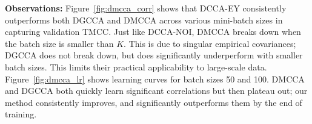 
\textbf{Observations:}
Figure~\ref{fig:dmcca_corr} shows that DCCA-EY consistently outperforms both DGCCA and DMCCA across various mini-batch sizes in capturing validation TMCC.
Just like DCCA-NOI, DMCCA breaks down when the batch size is smaller than $K$. This is due to singular empirical covariances; DGCCA does not break down, but does significantly underperform with smaller batch sizes.
This limits their practical applicability to large-scale data.
Figure~\ref{fig:dmcca_lr} shows learning curves for batch sizes 50 and 100.
DMCCA and DGCCA both quickly learn significant correlations but then plateau out; our method consistently improves, and significantly outperforms them by the end of training.



